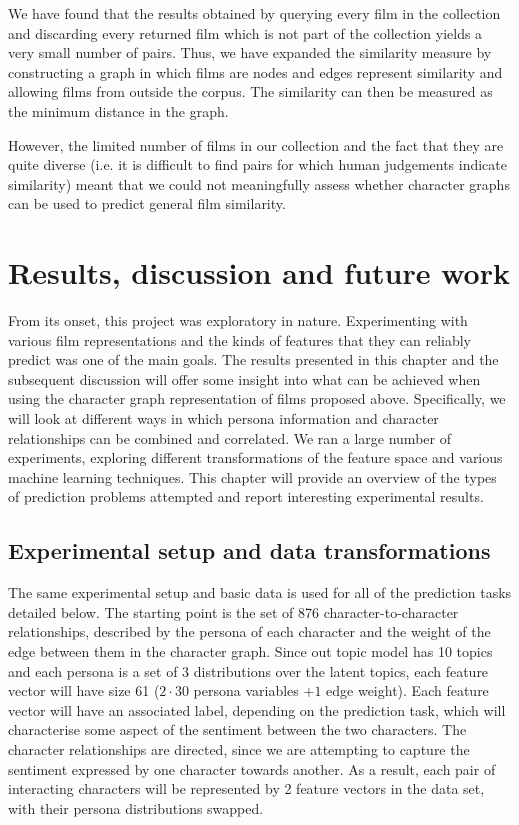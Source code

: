 \documentclass[bsc,frontabs,singlespacing,parskip]{infthesis} %
\begin{document}
We have found that the results obtained by querying every film in the collection and discarding every returned film which is not part of the collection yields a very small number of pairs. Thus, we have expanded the similarity measure by constructing a graph in which films are nodes and edges represent similarity and allowing films from outside the corpus. The similarity can then be measured as the minimum distance in the graph.

However, the limited number of films in our collection and the fact that they are quite diverse (i.e. it is difficult to find pairs for which human judgements indicate similarity) meant that we could not meaningfully assess whether character graphs can be used to predict general film similarity. 

\chapter{Results, discussion and future work}

From its onset, this project was exploratory in nature. Experimenting with various film representations and the kinds of features that they can reliably predict was one of the main goals. The results presented in this chapter and the subsequent discussion will offer some insight into what can be achieved when using the character graph representation of films proposed above. Specifically, we will look at different ways in which persona information and character relationships can be combined and correlated. We ran a large number of experiments, exploring different transformations of the feature space and various machine learning techniques. This chapter will provide an overview of the types of prediction problems attempted and report interesting experimental results.

\section{Experimental setup and data transformations}
The same experimental setup and basic data is used for all of the prediction tasks detailed below. The starting point is the set of 876 character-to-character relationships, described by the persona of each character and the weight of the edge between them in the character graph. Since out topic model has 10 topics and each persona is a set of 3 distributions over the latent topics, each feature vector will have size 61 ($2 \cdot 30$ persona variables $+ 1$ edge weight). Each feature vector will have an associated label, depending on the prediction task, which will characterise some aspect of the sentiment between the two characters. The character relationships are directed, since we are attempting to capture the sentiment expressed by one character towards another. As a result, each pair of interacting characters will be represented by 2 feature vectors in the data set, with their persona distributions swapped.
\end{document}

